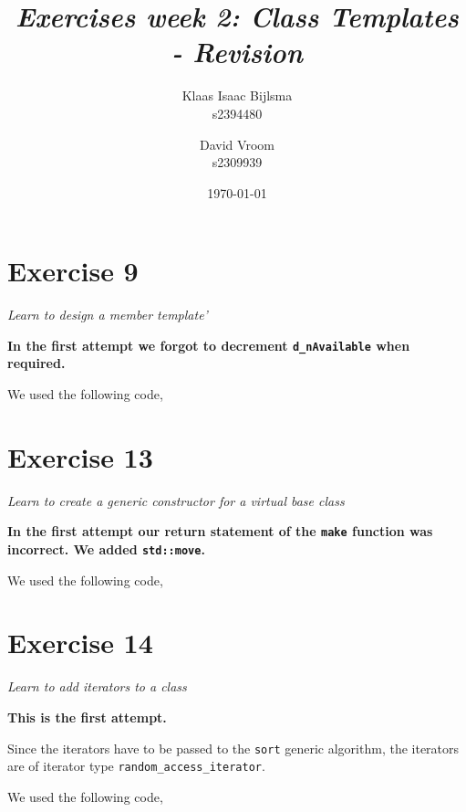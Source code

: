 \documentclass[12pt]{article}
\title{\itshape Exercises week 2: Class Templates - Revision}
\author{
	Klaas Isaac Bijlsma \\ s2394480
	\and
	David Vroom \\ s2309939
}
\date{\today}
\newcommand{\desc}[1]{\textit{#1} \vspace{1em}}
\begin{document}
\maketitle

\section*{Exercise 9}
\desc{Learn to design a member template'}

\textbf{In the first attempt we forgot to decrement \texttt{d\_nAvailable} when required.}

We used the following code,



\clearpage


\section*{Exercise 13}
\desc{Learn to create a generic constructor for a virtual base class}

\textbf{In the first attempt our return statement of the \texttt{make} function was incorrect. We added \texttt{std::move}.}

We used the following code,







 



 

   

\clearpage

\section*{Exercise 14}
\desc{Learn to add iterators to a class}

\textbf{This is the first attempt.}

Since the iterators have to be passed to the \texttt{sort} generic algorithm, the iterators are of iterator type \texttt{random\_access\_iterator}.

We used the following code,




\clearpage
\end{document}
